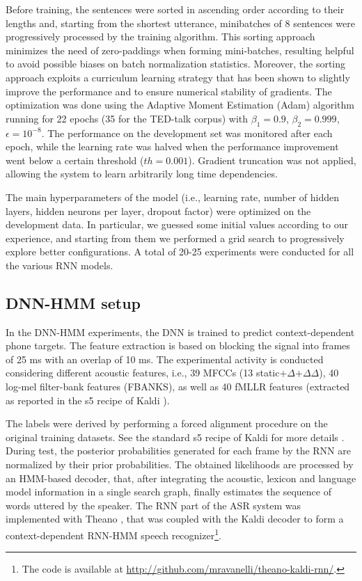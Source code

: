\documentclass[journal]{IEEEtran}
\begin{document}
Before training, the sentences were sorted in ascending order according to their lengths and, starting from the shortest utterance, minibatches of 8 sentences were progressively processed by the training algorithm.
This sorting approach minimizes the need of zero-paddings when forming mini-batches, resulting helpful to avoid possible biases on batch normalization statistics. Moreover, the sorting approach exploits a curriculum learning strategy \cite{curriculum} that has been shown to slightly improve the performance and to ensure numerical stability of gradients. The optimization was done using the Adaptive Moment Estimation (Adam) algorithm \cite{adam} running for 22 epochs (35 for the TED-talk corpus) with $\beta_1=0.9$, $\beta_2=0.999$, $\epsilon=10^{-8}$. The performance on the development set was monitored after each epoch, while the learning rate was halved when the performance improvement went below a certain threshold ($th=0.001$). Gradient truncation was not applied, allowing the system to learn arbitrarily long time dependencies.

The main hyperparameters of the model (i.e., learning rate, number of hidden layers, hidden neurons per layer, dropout factor) were optimized on the development data. 
In particular, we guessed some initial values according to our experience, and starting from them we performed a grid search to progressively explore better configurations. A total of 20-25 experiments were conducted for all the various RNN models.


\subsection{DNN-HMM setup} \label{sec:hmm_dnn}
In the DNN-HMM experiments, the DNN is trained to predict context-dependent phone targets. 
The feature extraction is based on blocking the signal into frames of 25 ms with an overlap of 10 ms.  The experimental activity is conducted considering different acoustic features, i.e., 39 MFCCs (13 static+$\Delta$+$\Delta\Delta$), 40 log-mel filter-bank features (FBANKS), as well as 40 fMLLR features (extracted as reported in the s5 recipe of Kaldi \cite{kaldi}).

The labels were derived by performing a forced alignment procedure on the original training datasets. See the standard s5 recipe of Kaldi for more details \cite{kaldi}.
During test, the posterior probabilities generated  for each frame by the RNN are normalized by their prior probabilities. 
The obtained likelihoods are processed by an HMM-based decoder, that, after integrating the acoustic, lexicon and language model information in a single search graph, finally estimates the sequence of words uttered  by the speaker.
The RNN part of the ASR system was implemented with Theano \cite{theano}, that was  coupled with the Kaldi decoder \cite{kaldi} to form a context-dependent RNN-HMM speech recognizer\footnote{The code is available at \url{http://github.com/mravanelli/theano-kaldi-rnn/}.}.
\end{document}

